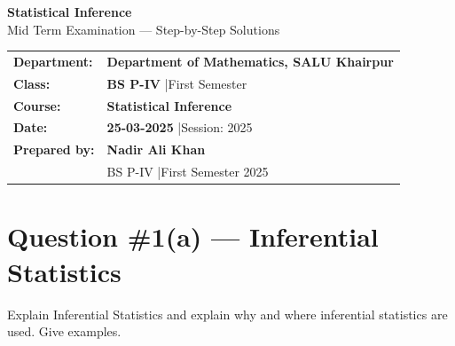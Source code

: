 \documentclass[12pt]{article}
\begin{document}
\thispagestyle{empty}

\begin{tcolorbox}[
  enhanced, arc=0pt, boxrule=0pt,
  colback=primary, colframe=primary,
  left=16pt, right=16pt, top=18pt, bottom=14pt,
  borderline south={4pt}{0pt}{accent},
]
  \centering
  {\huge\bfseries\color{white} Statistical Inference}\\[6pt]
  {\large\color{lightbg} Mid Term Examination --- Step-by-Step Solutions}
\end{tcolorbox}

\vspace{4pt}

\begin{tcolorbox}[
  enhanced, arc=0pt, boxrule=0pt,
  colback=white, colframe=white,
  borderline north={1.5pt}{0pt}{accent!60},
  borderline south={1.5pt}{0pt}{accent!60},
  left=16pt, right=16pt, top=12pt, bottom=12pt,
]
  \begin{tabular}{p{3.2cm} p{9.5cm}}
    \textcolor{primary}{\textbf{Department:}}
      & \textbf{Department of Mathematics, SALU Khairpur} \\[4pt]
    \textcolor{primary}{\textbf{Class:}}
      & \textbf{BS P-IV} \quad|\quad First Semester \\[4pt]
    \textcolor{primary}{\textbf{Course:}}
      & \textbf{Statistical Inference} \\[4pt]
    \textcolor{primary}{\textbf{Date:}}
      & \textbf{25-03-2025} \quad|\quad Session: 2025 \\[4pt]
    \textcolor{primary}{\textbf{Prepared by:}}
      & \textbf{Nadir Ali Khan} \\
      & {\small\color{darktext}BS P-IV \quad|\quad First Semester 2025} \\
  \end{tabular}
\end{tcolorbox}

\vspace{14pt}

\section{Question \#1(a) --- Inferential Statistics}

\begin{problembox}
Explain Inferential Statistics and explain why and where inferential statistics are used. Give examples.
\end{problembox}
\end{document}

